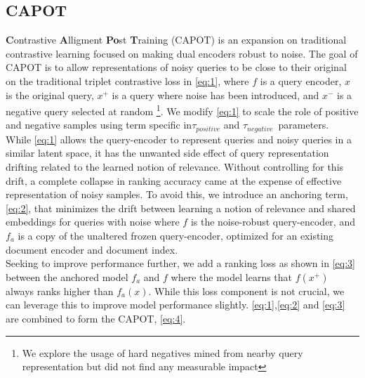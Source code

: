 \subsection{CAPOT}
\textbf{C}ontrastive \textbf{A}lligment \textbf{Po}st \textbf{T}raining (CAPOT) is an expansion on traditional contrastive learning focused on making dual encoders robust to noise. The goal of CAPOT is to allow representations of noisy queries to be close to their original on the traditional triplet contrastive loss \cite{Schroff2015FaceNetAU} in \ref{eq:1}, where $f$ is a query encoder, $x$ is the original query, $x^+$ is a query where noise has been introduced, and $x^-$ is a negative query selected at random \footnote{We explore the usage of hard negatives mined from nearby query representation but did not find any measurable impact}. We modify \ref{eq:1} to scale the role of positive and negative samples using term specific in$\tau_{positive}$ and $\tau_{negative}$\ parameters. \\
While \ref{eq:1} allows the query-encoder to represent queries and noisy queries in a similar latent space, it has the unwanted side effect of query representation drifting related to the learned notion of relevance. Without controlling for this drift, a complete collapse in ranking accuracy came at the expense of effective representation of noisy samples. To avoid this, we introduce an anchoring term,\ref{eq:2}, that minimizes the drift between learning a notion of relevance and shared embeddings for queries with noise where $f$ is the noise-robust query-encoder, and $f_a$ is a copy of the unaltered frozen query-encoder, optimized for an existing document encoder and document index. \\
Seeking to improve performance further, we add a ranking loss as shown in \ref{eq:3} between the anchored model $f_a$ and $f$ where the model learns that $f(x^+)$ always ranks higher than $f_a(x)$. While this loss component is not crucial, we can leverage this to improve model performance slightly. \ref{eq:1},\ref{eq:2} and \ref{eq:3} are combined to form the CAPOT, \ref{eq:4}. 
